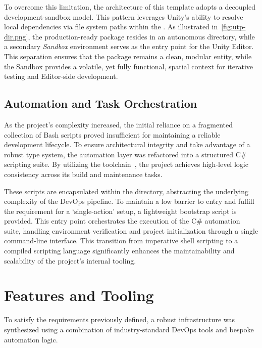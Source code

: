 To overcome this limitation, the architecture of this template adopts a decoupled development-sandbox model. This pattern leverages Unity’s ability to resolve local dependencies via file system paths within the . As illustrated in~\cref{fig:utp-dir.png}, the production-ready package resides in an autonomous directory, while a secondary \emph{Sandbox} environment serves as the entry point for the Unity Editor. This separation ensures that the package remains a clean, modular entity, while the Sandbox provides a volatile, yet fully functional, spatial context for iterative testing and Editor-side development.


\subsection{Automation and Task Orchestration}

As the project’s complexity increased, the initial reliance on a fragmented collection of Bash scripts proved insufficient for maintaining a reliable development lifecycle. To ensure architectural integrity and take advantage of a robust type system, the automation layer was refactored into a structured C\# scripting suite. By utilizing the  toolchain~\cite{dotnet_script_2026}, the project achieves high-level logic consistency across its build and maintenance tasks.

These scripts are encapsulated within the  directory, abstracting the underlying complexity of the DevOps pipeline. To maintain a low barrier to entry and fulfill the requirement for a `single-action' setup, a lightweight  bootstrap script is provided. This entry point orchestrates the execution of the C\# automation suite, handling environment verification and project initialization through a single command-line interface. This transition from imperative shell scripting to a compiled scripting language significantly enhances the maintainability and scalability of the project's internal tooling.

\section{Features and Tooling}

To satisfy the requirements previously defined, a robust infrastructure was synthesized using a combination of industry-standard DevOps tools and bespoke automation logic.

